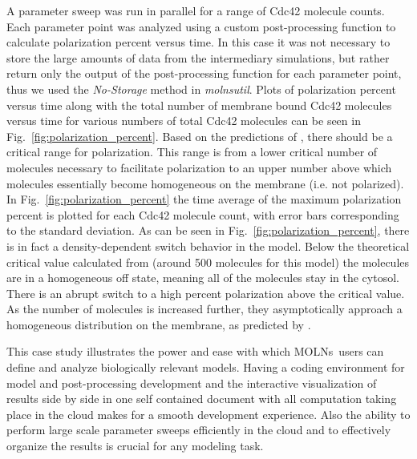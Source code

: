 \documentclass[final,leqno,onefignum,onetabnum]{siamltex1213}
\def\packagename {MOLNs}
\begin{document}
A parameter sweep was run in parallel for a range of Cdc42 molecule counts. Each parameter point was analyzed using a custom post-processing function to calculate polarization percent versus time. In this case it was not necessary to store the large amounts of data from the intermediary simulations, but rather return only the output of the post-processing function for each parameter point, thus we used the \emph{No-Storage} method in \emph{molnsutil}.  Plots of polarization percent versus time along with the total number of membrane bound Cdc42 molecules versus time for various numbers of total Cdc42 molecules can be seen in Fig.~\ref{fig:polarization_percent}. Based on the predictions of \cite{Altschuler2011}, there should be a critical range for polarization. This range is from a lower critical number of molecules necessary to facilitate polarization to an upper number above which molecules essentially become homogeneous on the membrane (i.e. not polarized). In Fig.~\ref{fig:polarization_percent} the time average of the maximum polarization percent is plotted for each Cdc42 molecule count, with error bars corresponding to the standard deviation. As can be seen in Fig.~\ref{fig:polarization_percent}, there is in fact a density-dependent switch behavior in the model. Below the theoretical critical value calculated from \cite{Altschuler2011} (around 500 molecules for this model) the molecules are in a homogeneous off state, meaning all of the molecules stay in the cytosol. There is an abrupt switch to a high percent polarization above the critical value. As the number of molecules is increased further, they asymptotically approach a homogeneous distribution on the membrane, as predicted by \cite{Altschuler2011}.

This case study illustrates the power and ease with which \packagename~users can define and analyze biologically relevant models. Having a coding environment for model and post-processing development and the interactive visualization of results side by side in one self contained document with all computation taking place in the cloud makes for a smooth development experience. Also the ability to perform large scale parameter sweeps efficiently in the cloud and to effectively organize the results is crucial for any modeling task.  
\end{document}
